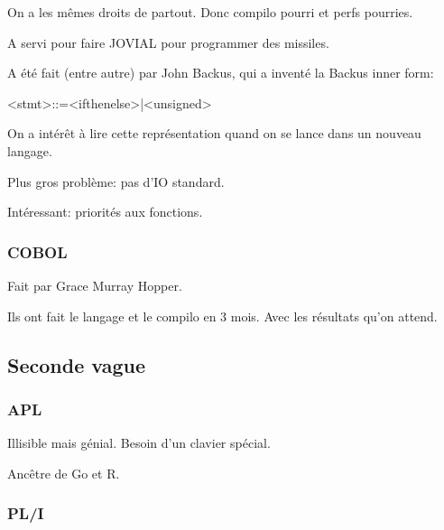 \documentclass[a4paper,11pt]{article}
\begin{document}
On a les mêmes droits de partout. Donc compilo pourri et perfs pourries.

A servi pour faire JOVIAL pour programmer des missiles.

A été fait (entre autre) par John Backus, qui a inventé la Backus inner form:

<stmt>::=<ifthenelse>|<unsigned>

On a intérêt à lire cette représentation quand on se lance dans un nouveau
langage.

Plus gros problème: pas d'IO standard.

Intéressant: priorités aux fonctions.

\subsubsection{COBOL}

Fait par Grace Murray Hopper.

Ils ont fait le langage et le compilo en 3 mois. Avec les résultats qu'on
attend.

\subsection{Seconde vague}

\subsubsection{APL}

Illisible mais génial. Besoin d'un clavier spécial.

Ancêtre de Go et R.

\subsubsection{PL/I}
\end{document}
